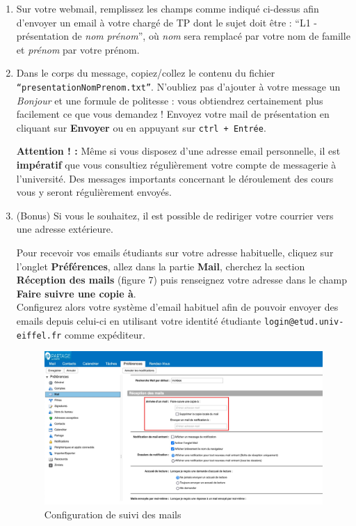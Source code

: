 \documentclass{article}
\begin{document}
\begin{exercice}
\begin{enumerate}
\item Sur votre webmail,   remplissez les champs comme indiqué ci-dessus afin
   d'envoyer un email à votre chargé de TP dont le sujet doit être : ``L1 -
   présentation de \emph{nom}  \emph{prénom}'',   où \emph{nom} sera remplacé par votre nom de famille et \emph{prénom} par votre prénom.
   
\item Dans le corps du message,  copiez/collez le contenu du fichier \texttt{``presentationNomPrenom.txt''}.
   N'oubliez pas d'ajouter à votre message un \emph{Bonjour} et une formule de politesse :
   vous obtiendrez certainement plus facilement ce que vous demandez !
   Envoyez votre mail de présentation en cliquant sur \textbf{Envoyer} ou
   en appuyant sur \texttt{ctrl + Entrée}.

\medskip

   \textbf{Attention ! : } Même si vous disposez d’une adresse email personnelle,   il
   est \textbf{impératif} que vous consultiez régulièrement votre compte de
   messagerie à l’université. Des messages importants concernant le déroulement
   des cours vous y seront régulièrement envoyés.

\item (Bonus) Si vous le souhaitez, il est possible de rediriger votre courrier
   vers une adresse extérieure. 

\medskip

   Pour recevoir vos emails étudiants sur votre adresse habituelle,   cliquez sur
   l'onglet \textbf{Préférences},   allez dans la partie \textbf{Mail},   cherchez la section
   \textbf{Réception des mails} (figure 7) puis renseignez votre adresse dans le champ \textbf{Faire
   suivre une copie à}. \\
   Configurez alors votre système d'email habituel afin
   de pouvoir envoyer des emails depuis celui-ci en utilisant votre identité
   étudiante \texttt{login@etud.univ-eiffel.fr} comme expéditeur.
 
 \begin{figure}[h!]
    \begin{center}
    \includegraphics[scale=0.25]{copie_mail.jpg}
    \caption{Configuration de suivi des mails}
     \end{center}
\end{figure}    


\end{enumerate}
\end{exercice}
\end{document}
